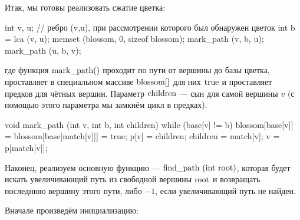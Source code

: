 
Итак, мы готовы реализовать сжатие цветка:

\code
int v, u; // ребро (v,u), при рассмотрении которого был обнаружен цветок
int b = lca (v, u);
memset (blossom, 0, sizeof blossom);
mark_path (v, b, u);
mark_path (u, b, v);
\endcode

где функция $\rm mark\_path()$ проходит по пути от вершины до базы цветка, проставляет в специальном массиве $\rm blossom[]$ для них $\rm true$ и проставляет предков для чётных вершин. Параметр $\rm children$ --- сын для самой вершины $v$ (с помощью этого параметра мы замкнём цикл в предках).

\code
void mark_path (int v, int b, int children) {
	while (base[v] != b) {
		blossom[base[v]] = blossom[base[match[v]]] = true;
		p[v] = children;
		children = match[v];
		v = p[match[v]];
	}
}
\endcode

Наконец, реализуем основную функцию --- $\rm find\_path ~ (int ~ root)$, которая будет искать увеличивающий путь из свободной вершины $\rm root$ и возвращать последнюю вершину этого пути, либо $-1$, если увеличивающий путь не найден.

Вначале произведём инициализацию:


